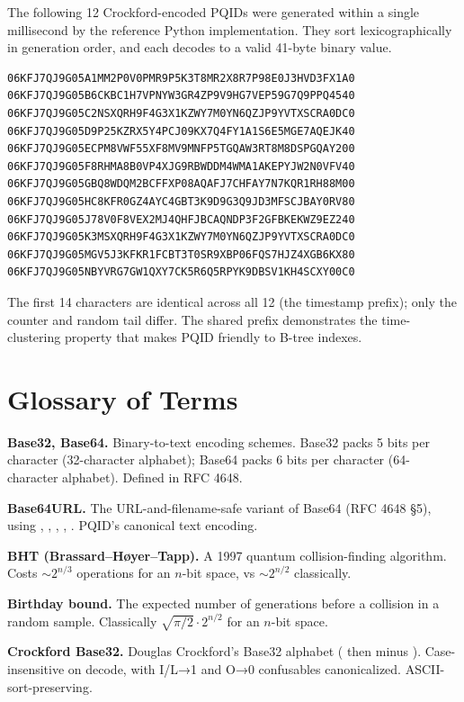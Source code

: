 The following 12 Crockford-encoded PQIDs were generated within a single millisecond by the reference Python implementation. They sort lexicographically in generation order, and each decodes to a valid 41-byte binary value.

\begin{lstlisting}[basicstyle=\ttfamily\scriptsize]
06KFJ7QJ9G05A1MM2P0V0PMR9P5K3T8MR2X8R7P98E0J3HVD3FX1A0
06KFJ7QJ9G05B6CKBC1H7VPNYW3GR4ZP9V9HG7VEP59G7Q9PPQ4540
06KFJ7QJ9G05C2NSXQRH9F4G3X1KZWY7M0YN6QZJP9YVTXSCRA0DC0
06KFJ7QJ9G05D9P25KZRX5Y4PCJ09KX7Q4FY1A1S6E5MGE7AQEJK40
06KFJ7QJ9G05ECPM8VWF55XF8MV9MNFP5TGQAW3RT8M8DSPGQAY200
06KFJ7QJ9G05F8RHMA8B0VP4XJG9RBWDDM4WMA1AKEPYJW2N0VFV40
06KFJ7QJ9G05GBQ8WDQM2BCFFXP08AQAFJ7CHFAY7N7KQR1RH88M00
06KFJ7QJ9G05HC8KFR0GZ4AYC4GBT3K9D9G3Q9JD3MFSCJBAY0RV80
06KFJ7QJ9G05J78V0F8VEX2MJ4QHFJBCAQNDP3F2GFBKEKWZ9EZ240
06KFJ7QJ9G05K3MSXQRH9F4G3X1KZWY7M0YN6QZJP9YVTXSCRA0DC0
06KFJ7QJ9G05MGV5J3KFKR1FCBT3T0SR9XBP06FQS7HJZ4XGB6KX80
06KFJ7QJ9G05NBYVRG7GW1QXY7CK5R6Q5RPYK9DBSV1KH4SCXY00C0
\end{lstlisting}

The first 14 characters are identical across all 12 (the timestamp prefix); only the counter and random tail differ. The shared prefix demonstrates the time-clustering property that makes PQID friendly to B-tree indexes.

\section{Glossary of Terms}
\label{app:glossary}

\textbf{Base32, Base64.} Binary-to-text encoding schemes. Base32 packs 5 bits per character (32-character alphabet); Base64 packs 6 bits per character (64-character alphabet). Defined in RFC 4648.

\textbf{Base64URL.} The URL-and-filename-safe variant of Base64 (RFC 4648 §5), using , , , \code{-}, \code{\_}. PQID's canonical text encoding.

\textbf{BHT (Brassard--H{\o}yer--Tapp).} A 1997 quantum collision-finding algorithm. Costs $\sim 2^{n/3}$ operations for an $n$-bit space, vs $\sim 2^{n/2}$ classically.

\textbf{Birthday bound.} The expected number of generations before a collision in a random sample. Classically $\sqrt{\pi/2} \cdot 2^{n/2}$ for an $n$-bit space.

\textbf{Crockford Base32.} Douglas Crockford's Base32 alphabet ( then  minus ). Case-insensitive on decode, with I/L→1 and O→0 confusables canonicalized. ASCII-sort-preserving.


